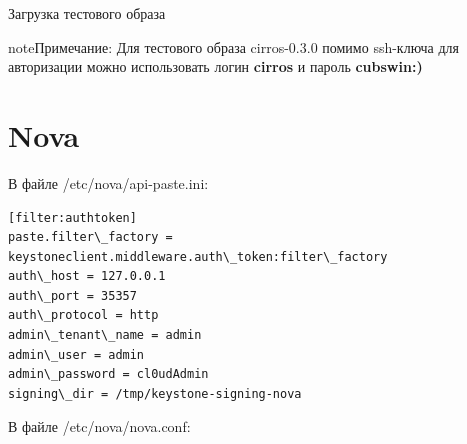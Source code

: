 \documentclass[letterpaper,10pt,russian]{sphinxmanual}
\begin{document}


Загрузка тестового образа


\begin{notice}{note}{Примечание:}
Для тестового образа cirros-0.3.0 помимо ssh-ключа для авторизации можно использовать  логин \textbf{cirros} и пароль \textbf{cubswin:)}
\end{notice}


\section{Nova}
\label{index:nova}


В файле /etc/nova/api-paste.ini:

\begin{Verbatim}[commandchars=\\\{\}]
[filter:authtoken]
paste.filter\_factory = keystoneclient.middleware.auth\_token:filter\_factory
auth\_host = 127.0.0.1
auth\_port = 35357
auth\_protocol = http
admin\_tenant\_name = admin
admin\_user = admin
admin\_password = cl0udAdmin
signing\_dir = /tmp/keystone-signing-nova
\end{Verbatim}

В файле /etc/nova/nova.conf:
\end{document}
